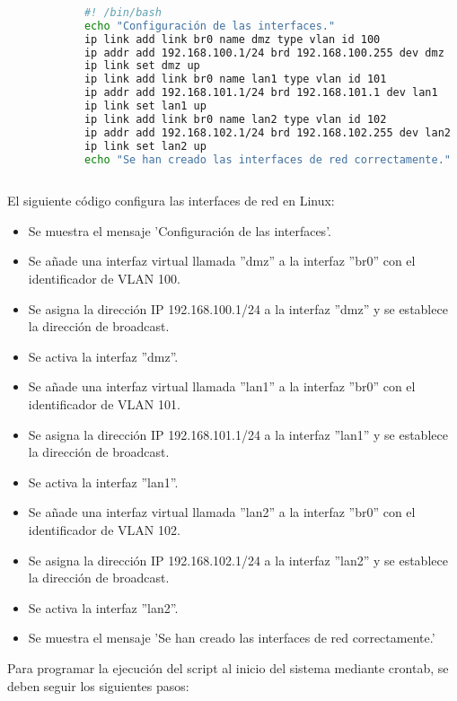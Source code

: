 	
		\begin{lstlisting}[language=Bash, caption=script de configuración de red]
	
			#! /bin/bash
			echo "Configuración de las interfaces."
			ip link add link br0 name dmz type vlan id 100
			ip addr add 192.168.100.1/24 brd 192.168.100.255 dev dmz
			ip link set dmz up
			ip link add link br0 name lan1 type vlan id 101
			ip addr add 192.168.101.1/24 brd 192.168.101.1 dev lan1
			ip link set lan1 up
			ip link add link br0 name lan2 type vlan id 102
			ip addr add 192.168.102.1/24 brd 192.168.102.255 dev lan2
			ip link set lan2 up
			echo "Se han creado las interfaces de red correctamente."
	
		\end{lstlisting}
	
		El siguiente código configura las interfaces de red en Linux:
		
		\begin{itemize}
			\item Se muestra el mensaje 'Configuración de las interfaces'.
		    \item Se añade una interfaz virtual llamada ''dmz'' a la interfaz ''br0'' con el identificador de VLAN 100.
			\item Se asigna la dirección IP 192.168.100.1/24 a la interfaz ''dmz'' y se establece la dirección de broadcast.
			\item Se activa la interfaz ''dmz''.
			\item Se añade una interfaz virtual llamada ''lan1'' a la interfaz ''br0'' con el identificador de VLAN 101.
			\item Se asigna la dirección IP 192.168.101.1/24 a la interfaz ''lan1'' y se establece la dirección de broadcast.
			\item Se activa la interfaz ''lan1''.
			\item Se añade una interfaz virtual llamada ''lan2'' a la interfaz ''br0'' con el identificador de VLAN 102.
			\item Se asigna la dirección IP 192.168.102.1/24 a la interfaz ''lan2'' y se establece la dirección de broadcast.
			\item Se activa la interfaz ''lan2''.
			\item Se muestra el mensaje 'Se han creado las interfaces de red correctamente.'
		\end{itemize}
	
		Para programar la ejecución del script al inicio del sistema mediante crontab, se deben seguir los siguientes pasos:
	

